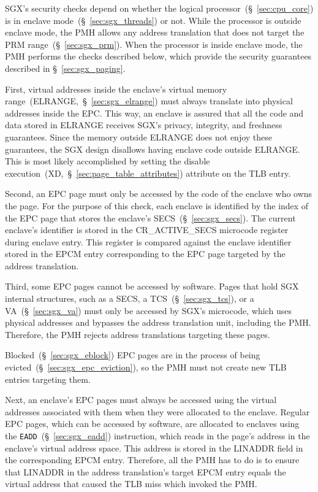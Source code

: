 SGX's security checks depend on whether the logical
processor~(\S~\ref{sec:cpu_core}) is in enclave mode~(\S~\ref{sec:sgx_threads})
or not. While the processor is outside enclave mode, the PMH allows any address
translation that does not target the PRM range~(\S~\ref{sec:sgx_prm}). When the
processor is inside enclave mode, the PMH performs the checks described below,
which provide the security guarantees described in \S~\ref{sec:sgx_paging}.

First, virtual addresses inside the enclave's virtual memory
range~(ELRANGE,~\S~\ref{sec:sgx_elrange}) must always translate into physical
addresses inside the EPC. This way, an enclave is assured that all the code and
data stored in ELRANGE receives SGX's privacy, integrity, and freshness
guarantees. Since the memory outside ELRANGE does not enjoy these guarantees,
the SGX design disallows having enclave code outside ELRANGE. This is most
likely accomplished by setting the disable
execution~(XD,~\S~\ref{sec:page_table_attributes}) attribute on the TLB entry.

Second, an EPC page must only be accessed by the code of the enclave who owns
the page. For the purpose of this check, each enclave is identified by the
index of the EPC page that stores the enclave's SECS~(\S~\ref{sec:sgx_secs}).
The current enclave's identifier is stored in the CR\_ACTIVE\_SECS microcode
register during enclave entry. This register is compared against the enclave
identifier stored in the EPCM entry corresponding to the EPC page targeted by
the address translation.


Third, some EPC pages cannot be accessed by software. Pages that hold SGX
internal structures, such as a SECS, a TCS~(\S~\ref{sec:sgx_tcs}), or a
VA~(\S~\ref{sec:sgx_va}) must only be accessed by SGX's microcode, which uses
physical addresses and bypasses the address translation unit, including the
PMH. Therefore, the PMH rejects address translations targeting these pages.

Blocked~(\S~\ref{sec:sgx_eblock}) EPC pages are in the process of being
evicted~(\S~\ref{sec:sgx_epc_eviction}), so the PMH must not create new TLB
entries targeting them.

Next, an enclave's EPC pages must always be accessed using the virtual
addresses associated with them when they were allocated to the enclave. Regular
EPC pages, which can be accessed by software, are allocated to enclaves using
the \texttt{EADD}~(\S~\ref{sec:sgx_eadd}) instruction, which reads in the
page's address in the enclave's virtual address space. This address is stored
in the LINADDR field in the corresponding EPCM entry. Therefore, all the PMH
has to do is to ensure that LINADDR in the address translation's target EPCM
entry equals the virtual address that caused the TLB miss which invoked the
PMH.

